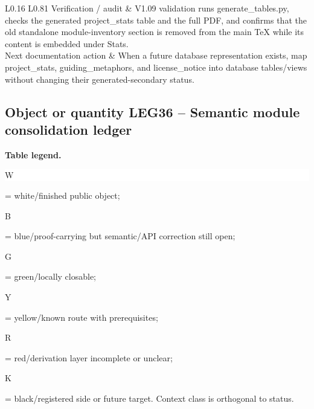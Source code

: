 \begin{longtable}{L{0.16\linewidth} L{0.81\linewidth}}
\hline\addlinespace[0.20em]
Verification /\allowbreak{} audit & V1.09 validation runs generate\_tables.py, checks the generated project\_stats table and the full PDF, and confirms that the old standalone module-inventory section is removed from the main TeX while its content is embedded under Stats.\\
\hline\addlinespace[0.20em]
Next documentation action & When a future database representation exists, map project\_stats, guiding\_metaphors, and license\_notice into database tables/\allowbreak{}views without changing their generated-secondary status.\\
\hline\addlinespace[0.20em]
\end{longtable}
\subsection*{Object or quantity LEG36 -- Semantic module consolidation ledger}
\hypertarget{objproof:LEG36}{}
\par\smallskip\noindent\begin{minipage}{0.99\linewidth}\footnotesize\raggedright\textbf{Table legend.} \colorbox{white}{\strut W} = white/finished public object; \colorbox{cyan!20}{\strut B} = blue/proof-carrying but semantic/API correction still open; \colorbox{green!18}{\strut G} = green/locally closable; \colorbox{yellow!25}{\strut Y} = yellow/known route with prerequisites; \colorbox{red!20}{\strut R} = red/derivation layer incomplete or unclear; \colorbox{black!18}{\strut K} = black/registered side or future target. Context class is orthogonal to status.\end{minipage}\par\vspace{0.25em}
